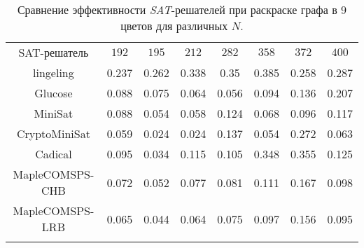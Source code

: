 \begin{table}[h]
\centering
\captionsetup{justification=centering}
\caption{Сравнение эффективности \textit{SAT}-решателей при раскраске графа в $9$ цветов для различных $N$.}
\label{chapter3:tab:color9}
\begin{tabular}{@{}|c|c|c|c|c|c|c|c|}
\Xhline{4\arrayrulewidth}
SAT-решатель          & $192$ & $195$ & $212$ & $282$ & $358$ & $372$ & $400$ \\ \Xhline{4\arrayrulewidth}
lingeling             & 0.237 & 0.262 & 0.338 & 0.35  & 0.385 & 0.258 & 0.287 \\ \hline
Glucose               & 0.088 & 0.075 & 0.064 & 0.056 & 0.094 & 0.136 & 0.207 \\ \hline
MiniSat               & 0.088 & 0.054 & 0.058 & 0.124 & 0.068 & 0.096 & 0.117 \\ \hline
CryptoMiniSat         & 0.059 & 0.024 & 0.024 & 0.137 & 0.054 & 0.272 & 0.063 \\ \hline
Cadical               & 0.095 & 0.034 & 0.115 & 0.105 & 0.348 & 0.355 & 0.125 \\ \hline
MapleCOMSPS-CHB       & 0.072 & 0.052 & 0.077 & 0.081 & 0.111 & 0.167 & 0.098 \\ \hline
MapleCOMSPS-LRB       & 0.065 & 0.044 & 0.064 & 0.075 & 0.097 & 0.156 & 0.095 \\ \Xhline{4\arrayrulewidth}
\end{tabular}
\end{table}